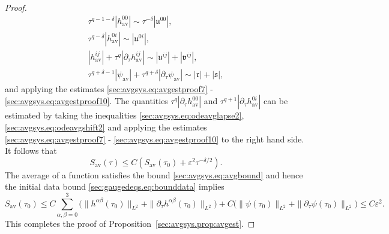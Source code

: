 \documentclass[10pt,a4paper]{amsart}
\newcommand{\av}{\mathrm{av}}
\newcommand{\mf}{\mathfrak}
\newcommand{\pa}{\partial}
\newcommand{\ve}{\varepsilon}
\begin{document}
\begin{proof}
\begin{subequations}
        \begin{gather}
            \tau^{q-1-\delta}| h_{\av}^{00}| \sim \tau^{-\delta}|\mf{u}^{00}|,\\
            \tau^{q-\delta}|h_{\av}^{0i}| \sim |\mf{u}^{0i}|,\\
            |h_{\av}^{ij}| + \tau^q|\pa_\tau h_{\av}^{ij}| \sim |\mf{u}^{ij}| + |\mf{v}^{ij}|,\\
            \tau^{q+\delta-1}|\psi_{\av}| + \tau^{q+\delta}|\pa_\tau \psi_{\av}|  \sim  |\mf{r}| + |\mf{s}|,
        \end{gather}
    \end{subequations}
    and applying the estimates \eqref{sec:avgsys.eq:avgestproof7} - \eqref{sec:avgsys.eq:avgestproof10}. The quantities $\tau^q |\pa_\tau h_{\av}^{00}|$ and $\tau^{q+1}|\pa_\tau h_{\av}^{0i}|$ can be estimated by taking the inequalities \eqref{sec:avgsys.eq:odeavglapse2}, \eqref{sec:avgsys.eq:odeavgshift2} and applying the estimates \eqref{sec:avgsys.eq:avgestproof7} - \eqref{sec:avgsys.eq:avgestproof10} to the right hand side. It follows that
    \begin{equation}
        S_{\av}(\tau) \leq C(S_{\av}(\tau_0) + \ve^2\tau^{-\delta/2}).
    \end{equation}
    The average of a function satisfies the bound \eqref{sec:avgsys.eq:avgbound} and hence the initial data bound \eqref{sec:gaugedeqs.eq:bounddata} implies
    \begin{equation}
        S_{\av}(\tau_0) \leq C\sum_{\alpha,\beta=0}^3\Big(\|h^{\alpha\beta}(\tau_0)\|_{L^2} + \|\pa_\tau h^{\alpha\beta}(\tau_0)\|_{L^2}\Big) + C\big(\|\psi(\tau_0)\|_{L^2} + \|\pa_\tau \psi(\tau_0)\|_{L^2}\big) \leq C\ve^2.
    \end{equation}
    This completes the proof of Proposition~\ref{sec:avgsys.prop:avgest}.
\end{proof}
\end{document}
